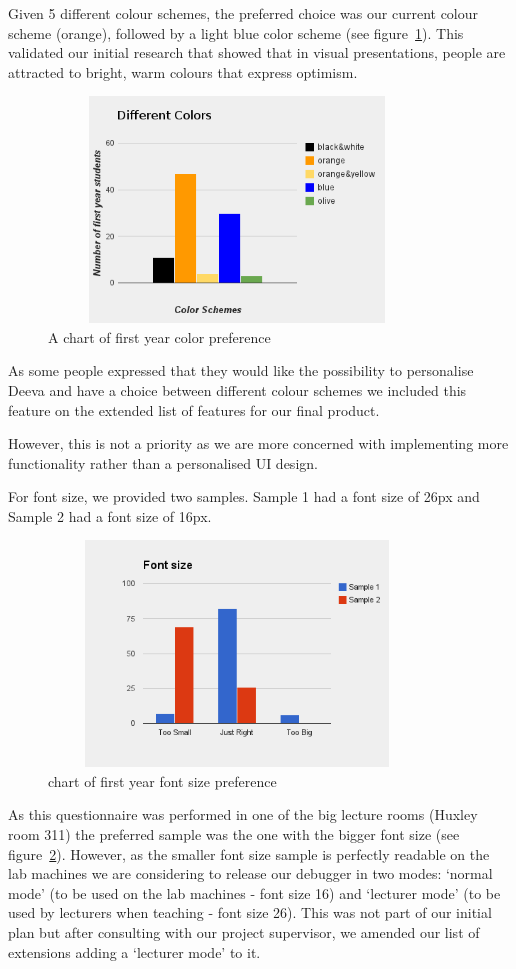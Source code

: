\documentclass[11pt, a4paper]{article}
\begin{document}
Given 5 different colour schemes, the preferred choice was our current colour scheme (orange), followed by a light blue color scheme (see figure~\ref{fig:colours}).
This validated our initial research that showed that in visual presentations, people are attracted to bright, warm colours that express optimism.
\begin{figure}[h!]
\centering
\includegraphics[height=60mm,width=100mm]{colours.png}
\caption{A chart of first year color preference}
\label{fig:colours}
\end{figure}

As some people expressed that they would like the possibility to personalise Deeva and have a choice between different colour schemes we included this feature on the extended list of features for our final product.

However, this is not a priority as we are more concerned with implementing more functionality rather than a personalised UI design.

For font size, we provided two samples.
Sample 1 had a font size of 26px and Sample 2 had a font size of 16px.
\begin{figure}[h!]
\centering
\includegraphics[height=60mm,width=100mm]{fonts.png}
\caption{chart of first year font size preference}
\label{fig:label}
\end{figure}
As this questionnaire was performed in one of the big lecture rooms (Huxley room 311) the preferred sample was the one with the bigger font size (see figure~\ref{fig:label}).
However, as the smaller font size sample is perfectly readable on the lab machines we are considering to release our debugger in two modes: `normal mode' (to be used on the lab machines - font size 16) and  `lecturer mode' (to be used by lecturers when teaching - font size 26).
This was not part of our initial plan but after consulting with our project supervisor, we amended our list of extensions adding a `lecturer mode' to it.
\end{document}
